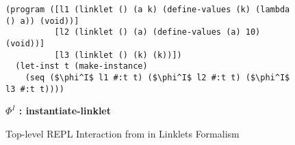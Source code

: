 

\begin{figure}[!htbp]
\centering
\footnotesize
\begin{minipage}{0.9\textwidth}
\begin{lstlisting}[mathescape,numbers=none]
(program ([l1 (linklet () (a k) (define-values (k) (lambda () a)) (void))]
          [l2 (linklet () (a) (define-values (a) 10) (void))]
          [l3 (linklet () (k) (k))])
  (let-inst t (make-instance)
    (seq ($\phi^I$ l1 #:t t) ($\phi^I$ l2 #:t t) ($\phi^I$ l3 #:t t))))
\end{lstlisting}
\begin{center}
    \textbf{
      $\Phi^I$ : instantiate-linklet
    }
  \end{center}
\end{minipage}
\caption{Top-level REPL Interaction from  in Linklets Formalism}
\label{fig:toplevel-example-repl-interactions-formal}
\end{figure}


